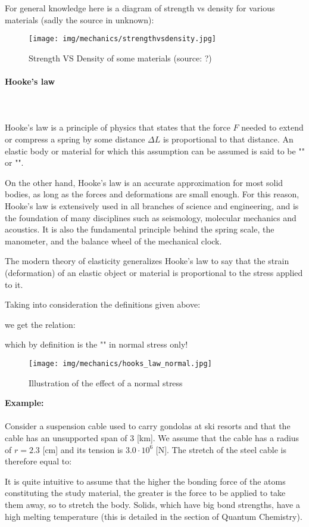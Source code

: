 	For general knowledge here is a diagram of strength vs density for various materials (sadly the source in unknown):
	\begin{figure}[H]
		\centering
		\texttt{[image: img/mechanics/strengthvsdensity.jpg]}
		\caption{Strength VS Density of some materials (source: ?)}
	\end{figure}
	
	\paragraph{Hooke's law}\mbox{}\\\\
	Hooke's law is a principle of physics that states that the force $F$ needed to extend or compress a spring by some distance $\Delta L$ is proportional to that distance. An elastic body or material for which this assumption can be assumed is said to be "" or "".

	On the other hand, Hooke's law is an accurate approximation for most solid bodies, as long as the forces and deformations are small enough. For this reason, Hooke's law is extensively used in all branches of science and engineering, and is the foundation of many disciplines such as seismology, molecular mechanics and acoustics. It is also the fundamental principle behind the spring scale, the manometer, and the balance wheel of the mechanical clock.

	The modern theory of elasticity generalizes Hooke's law to say that the strain (deformation) of an elastic object or material is proportional to the stress applied to it.
	
	Taking into consideration the definitions given above:
		
	we get the relation:
	
	which by definition is the "" in normal stress only!
	\begin{figure}[H]
		\centering
		\texttt{[image: img/mechanics/hooks\_law\_normal.jpg]}
		\caption{Illustration of the effect of a normal stress}
	\end{figure}
	\begin{tcolorbox}[colframe=black,colback=white,sharp corners]
	\textbf{{\Large {}}Example:}\\\\
	Consider a suspension cable used to carry gondolas at ski resorts and that the cable has an unsupported span of $3$ [km]. We assume that the cable has a radius of $r=2.3$ [cm] and its tension is $3.0\cdot 10^6$ [N]. The stretch of the steel cable is therefore equal to:
	
	\end{tcolorbox}
	It is quite intuitive to assume that the higher the bonding force of the atoms constituting the study material, the greater is the force to be applied to take them away, so to stretch the body. Solids, which have big bond strengths, have a high melting temperature (this is detailed in the section of Quantum Chemistry).
	
